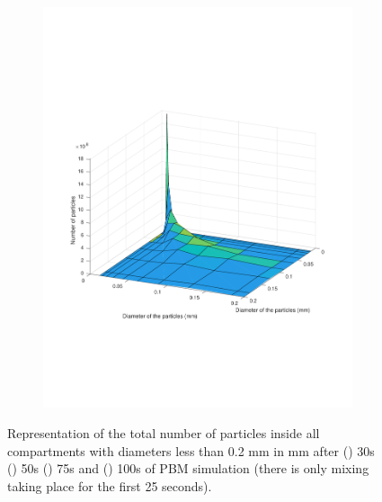 \documentclass[preprint,11pt,authoryear]{elsarticle}
\begin{document}
\begin{figure}
\begin{subfigure}{.5\textwidth}
\includegraphics[scale=0.45]{rslts-PBM_100s_psd.pdf}
\caption{}
\label{fig:100s}
\end{subfigure}
\caption{ Representation of the total number of particles inside all compartments with diameters less than 0.2 mm 
in mm after () 30s () 50s () 75s and
 () 100s of PBM simulation (there is only mixing taking place for the first 25 seconds).}
\label{fig:rslts_PBM_d50_plots}
\end{figure}   
\end{document}
